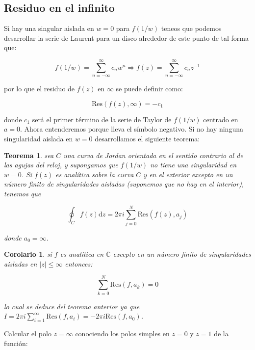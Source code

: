 \documentclass[12pt,a4paper]{book}
\newcommand{\D}{\mathrm{d}}
\newcommand{\Res}{\mathrm{Res}}
\newtheorem{theorem}{Teorema}[section]
\newtheorem{corollary}{Corolario}[theorem]
\begin{document}
\subsection{Residuo en el infinito}

Si hay una singular aislada en $w=0$ para $f(1/w)$ teneos que podemos desarrollar la serie de Laurent para un disco alrededor de este punto de tal forma que:

$$f(1/w) = \sum_{n= -\infty }^{\infty} c_n w^n \Longrightarrow f(z) = \sum_{n= -\infty }^{\infty} c_n z^{-1}$$

por lo que el residuo de $f(z)$ en $\infty$ se puede definir como:

\begin{equation}
\Res  (f(z), \infty) = - c_1
\end{equation}

donde $c_1$ será el primer término de la serie de Taylor de $f(1/w)$ centrado en $a=0$. Ahora entenderemos porque lleva el símbolo negativo. Si no hay ninguna singularidad aislada en $w=0$ desarrollamos el siguiente teorema:

\begin{theorem}
sea $C$ una curva de Jordan orientada en el sentido contrario al de las agujas del reloj, y supongamos que $f(1/w)$ no tiene una singularidad en $w=0$. Si $f(z)$ es analítica sobre la curva $C$ y en el exterior excepto en un número finito de singularidades aisladas (suponemos que no hay en el interior), tenemos que

$$ \oint_C f(z) \D z = 2 \pi i \sum_{j=0}^N \Res (f(z),a_j) $$

donde $a_0 = \infty$.
\end{theorem}

\begin{corollary}
si  $f$ es analítica en $\bar{\mathbb{C}}$ excepto en un número finito de singularidades aisladas en $|z| \leq  \infty$ entonces:

$$ \sum_{k=0}^N \Res  (f,a_k) = 0 $$

lo cual se deduce del teorema anterior ya que $I=2 \pi i\sum_{i=1}^{\infty} \Res (f,a_i) = - 2 \pi i \Res(f,a_0)$. 

\end{corollary}





\hrulefill


Calcular el polo $z=\infty$ conociendo los polos simples en $z=0$ y $z=1$ de la función:
\end{document}

